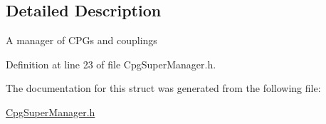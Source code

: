 \subsection{Detailed Description}
A manager of CPGs and couplings 

Definition at line 23 of file CpgSuperManager.h.



The documentation for this struct was generated from the following file:\begin{DoxyCompactItemize}
\item 
\hyperlink{CpgSuperManager_8h}{CpgSuperManager.h}\end{DoxyCompactItemize}

